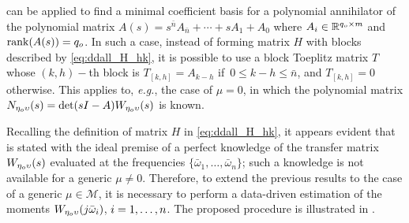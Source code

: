 \begin{remark}
  \label{rem:ddall_toeplitz}
   can be applied to find a minimal coefficient basis	for a polynomial annihilator of the polynomial matrix	$A(s)=s^{\bar{n}}A_{\bar{n}}+\cdots+sA_1+A_0$ where $A_i\in\mathbb{R}^{{q_o}\times m}$ and $\operatorname{rank}(A(s))={q_o}$. In such a case, instead of forming matrix $H$ with blocks described by	\eqref{eq:ddall_H_hk}, it is possible to use a block Toeplitz matrix $T$ whose $(k,h)-$th block is $T_{[k,h]}=A_{k-h}$ if $\,0\leq k-h \leq \bar{n}$, and	$T_{[k,h]}=0$ otherwise. This applies to, \emph{e.g.}, the case of $\mu=0$, in which the polynomial matrix $N_{\eta_o\upsilon}(s)=\det(sI-A)W_{\eta_o\upsilon}(s)$ is known.\closeremark
\end{remark}

Recalling the definition of matrix $H$ in \eqref{eq:ddall_H_hk}, it appears evident that  is stated with the ideal premise of a perfect knowledge of the transfer matrix $W_{\eta_o\upsilon}(s)$ evaluated at the frequencies $\{\bar{\omega}_1,\dotsc,\bar{\omega}_n\}$; such a knowledge is not available for a generic $\mu\neq 0$. Therefore, to extend the previous results to the case of a generic $\mu\in\mathcal{M}$, it is necessary to perform a data-driven estimation of the moments $W_{\eta_o\upsilon}(j\bar{\omega}_i)$, $i=1,\dotsc,n$. The proposed procedure is illustrated in .

